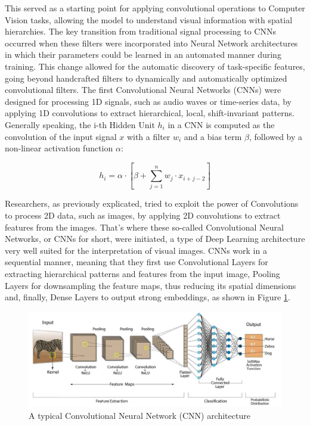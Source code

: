 This served as a starting point for applying convolutional operations to Computer Vision tasks, allowing the model to understand visual information with spatial hierarchies. The key transition from traditional signal processing to CNNs occurred when these filters were incorporated into Neural Network architectures in which their parameters could be learned in an automated manner during training. This change allowed for the automatic discovery of task-specific features, going beyond handcrafted filters to dynamically and automatically optimized convolutional filters.
The first Convolutional Neural Networks (CNNs) were designed for processing 1D signals, such as audio waves or time-series data, by applying 1D convolutions to extract hierarchical, local, shift-invariant patterns. Generally speaking, the i-th Hidden Unit $h_i$ in a CNN is computed as the convolution of the input signal $x$ with a filter $w_i$ and a bias term $\beta$, followed by a non-linear activation function $\alpha$:

\begin{center}
    \[
        h_i = \alpha \cdot [\beta + \sum_{j=1}^{n} w_{j} \cdot x_{i+j-2}]
    \]
\end{center}

Researchers, as previously explicated, tried to exploit the power of Convolutions to process 2D data, such as images, by applying 2D convolutions to extract features from the images. That's where these so-called Convolutional Neural Networks, or CNNs for short, were initiated, a type of Deep Learning architecture very well suited for the interpretation of visual images. CNNs work in a sequential manner, meaning that they first use Convolutional Layers for extracting hierarchical patterns and features from the input image, Pooling Layers for downsampling the feature maps, thus reducing its spatial dimensions and, finally, Dense Layers to output strong embeddings, as shown in Figure \ref{fig:CNNArchitecture}.

\begin{figure}[ht]
    \centering
    \includegraphics[width=1.0\textwidth]{images/CNN Architecture.jpg}
    \caption[A common CNN architecture]{A typical Convolutional Neural Network (CNN) architecture}
    \label{fig:CNNArchitecture}
\end{figure}

